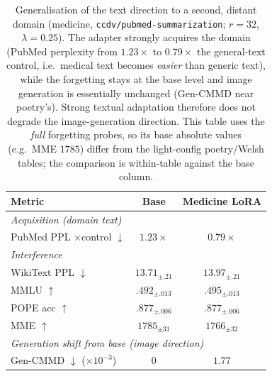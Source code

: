 \documentclass{article}
\begin{document}
\begin{table}[t]
\centering\small
\setlength{\tabcolsep}{12pt}
\begin{tabular}{lcc}
\toprule
\textbf{Metric} & \textbf{Base} & \textbf{Medicine LoRA} \\
\midrule
\multicolumn{3}{l}{\textit{Acquisition (domain text)}}\\
PubMed PPL $\times$control $\downarrow$ & $1.23\times$ & $\mathbf{0.79\times}$ \\
\midrule
\multicolumn{3}{l}{\textit{Interference}}\\
WikiText PPL $\downarrow$ & $13.71_{\pm.21}$ & $13.97_{\pm.21}$ \\
MMLU $\uparrow$           & $.492_{\pm.013}$  & $.495_{\pm.013}$ \\
POPE acc $\uparrow$       & $.877_{\pm.006}$  & $.877_{\pm.006}$ \\
MME $\uparrow$            & $1785_{\pm31}$  & $1766_{\pm32}$ \\
\midrule
\multicolumn{3}{l}{\textit{Generation shift from base (image direction)}}\\
Gen-CMMD $\downarrow$ ($\times10^{-3}$) & $0$ & $1.77$ \\
\bottomrule
\end{tabular}
\caption{Generalisation of the text direction to a second, distant domain
(medicine, \texttt{ccdv/pubmed-summarization}; $r{=}32$, $\lambda{=}0.25$). The
adapter strongly acquires the domain (PubMed perplexity from $1.23\times$ to
$0.79\times$ the general-text control, i.e.\ medical text becomes \emph{easier}
than generic text), while the forgetting stays at the base level and image
generation is essentially unchanged (Gen-CMMD near poetry's). Strong textual
adaptation therefore does not degrade the image-generation direction.
This table uses the \emph{full} forgetting probes, so its base absolute values
(e.g.\ MME $1785$) differ from the light-config poetry/Welsh tables; the
comparison is within-table against the base column.}
\label{tab:text-domain}
\end{table}
\end{document}

